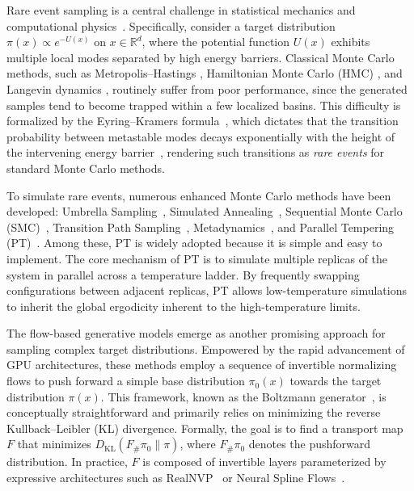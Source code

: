 \documentclass[%
 reprint,
 amsmath,amssymb,
 aps,
 pre,
]{revtex4-2}
\begin{document}
Rare event sampling is a central challenge in statistical mechanics and computational physics~\cite{bucklew2004introduction, rubino2009rare, rubino2009introduction}. Specifically, consider a target distribution $\pi(x) \propto e^{-U(x)}$ on $x\in\mathbb{R}^d$, where the potential function $U(x)$ exhibits multiple local modes separated by high energy barriers. Classical Monte Carlo methods, such as Metropolis--Hastings \cite{chib1995understanding, robert2009metropolis}, Hamiltonian Monte Carlo (HMC) \cite{betancourt2017conceptual, chen2014stochastic}, and Langevin dynamics \cite{meyn2012markov},
routinely suffer from poor performance, since the generated samples tend to become trapped within a few localized basins. This difficulty is formalized by the Eyring--Kramers formula~\cite{eyring1935activated, kramers1940brownian}, which dictates that the transition probability between metastable modes decays exponentially with the height of the intervening energy barrier~\cite{bouchet2016generalisation, lee2022non}, rendering such transitions as \emph{rare events} for standard Monte Carlo methods.

To simulate rare events, numerous enhanced Monte Carlo methods have been developed: Umbrella Sampling~\cite{torrie1977nonphysical, virnau2004calculation, kastner2011umbrella}, Simulated Annealing~\cite{van1987simulated, bertsimas1993simulated, nikolaev2010simulated}, Sequential Monte Carlo (SMC)~\cite{doucet2001introduction, cappe2007overview, chopin2020introduction, wills2023sequential}, Transition Path Sampling~\cite{dellago2002transition}, Metadynamics~\cite{laio2002escaping}, and Parallel Tempering (PT)~\cite{earl2005parallel, miasojedow2013adaptive, syed2022non, deng2023non}. Among these, PT is widely adopted because it is simple and easy to implement. The core mechanism of PT is to simulate multiple replicas of the system in parallel across a temperature ladder. By frequently swapping configurations between adjacent replicas, PT allows low-temperature simulations to inherit the global ergodicity inherent to the high-temperature limits.

The flow-based generative models emerge as another promising approach for sampling complex target distributions. Empowered by the rapid advancement of GPU architectures, these methods employ a sequence of invertible normalizing flows to push forward a simple base distribution $\pi_0(x)$ towards the target distribution $\pi(x)$. This framework, known as the Boltzmann generator~\cite{noe2019boltzmann,wu2020stochastic}, is conceptually straightforward and primarily relies on minimizing the reverse Kullback--Leibler (KL) divergence. Formally, the goal is to find a transport map $F$ that minimizes $D_{\text{KL}}(F_{\#} \pi_0 \| \pi)$, where $F_{\#} \pi_0$ denotes the pushforward distribution. In practice, $F$ is composed of invertible layers parameterized by expressive architectures such as RealNVP~\cite{dinh2016density} or Neural Spline Flows~\cite{durkan2019neural}.
\end{document}
